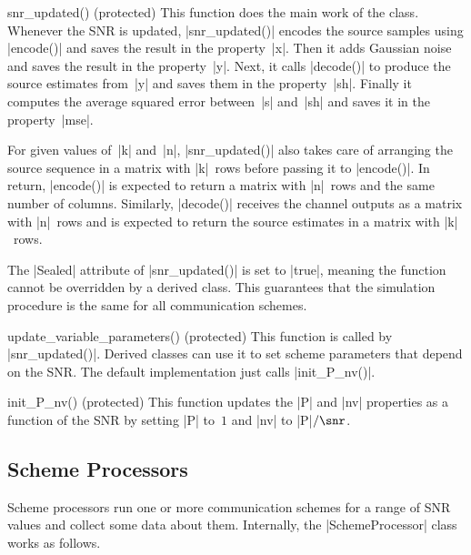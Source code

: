 \begin{method}{snr_updated(\obj) (protected)}
  This function does the main work of the class. Whenever the SNR is updated,
  |snr_updated()| encodes the source samples using |encode()| and saves the
  result in the property~|x|. Then it adds Gaussian noise and saves the result
  in the property~|y|. Next, it calls |decode()| to produce the source estimates
  from~|y| and saves them in the property~|sh|. Finally it computes the average
  squared error between~|s| and~|sh| and saves it in the property~|mse|. 

  For given values of~|k| and~|n|, |snr_updated()| also takes care of arranging
  the source sequence in a matrix with |k|~rows before passing it to |encode()|.
  In return, |encode()| is expected to return a matrix with |n|~rows and the
  same number of columns. Similarly, |decode()| receives the channel outputs as
  a matrix with |n|~rows and is expected to return the source estimates in a
  matrix with |k|~rows. 

  The |Sealed| attribute of |snr_updated()| is set to |true|, meaning the
  function cannot be overridden by a derived class. This guarantees that the
  simulation procedure is the same for all communication schemes. 
\end{method}

\begin{method}{update_variable_parameters(\obj) (protected)}
  This function is called by
  |snr_updated()|. Derived classes can use it to set scheme parameters that
  depend on the SNR. The default implementation just calls |init_P_nv()|.
\end{method}

\begin{method}{init_P_nv(\obj) (protected)}
  This function updates the |P| and |nv| properties as a function of the SNR by
  setting |P| to~$1$ and |nv| to |P|$ / \snr$.
\end{method}


\subsection{Scheme Processors}

Scheme processors run one or more communication schemes for a range of SNR
values and collect some data about them. Internally, the |SchemeProcessor| class
works as follows.

